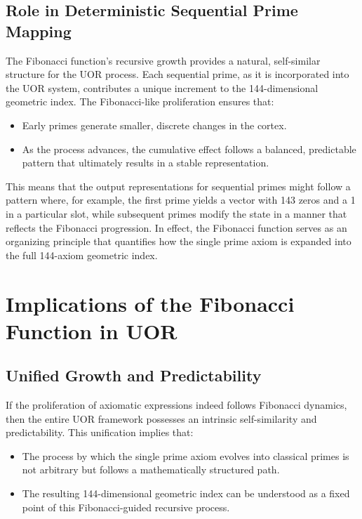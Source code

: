 \documentclass[11pt]{article}
\begin{document}
\subsection{Role in Deterministic Sequential Prime Mapping}
The Fibonacci function’s recursive growth provides a natural, self-similar structure for the UOR process. Each sequential prime, as it is incorporated into the UOR system, contributes a unique increment to the 144-dimensional geometric index. The Fibonacci-like proliferation ensures that:
\begin{itemize}
    \item Early primes generate smaller, discrete changes in the cortex.
    \item As the process advances, the cumulative effect follows a balanced, predictable pattern that ultimately results in a stable representation.
\end{itemize}
This means that the output representations for sequential primes might follow a pattern where, for example, the first prime yields a vector with 143 zeros and a 1 in a particular slot, while subsequent primes modify the state in a manner that reflects the Fibonacci progression. In effect, the Fibonacci function serves as an organizing principle that quantifies how the single prime axiom is expanded into the full 144-axiom geometric index.

\section{Implications of the Fibonacci Function in UOR}
\subsection{Unified Growth and Predictability}
If the proliferation of axiomatic expressions indeed follows Fibonacci dynamics, then the entire UOR framework possesses an intrinsic self-similarity and predictability. This unification implies that:
\begin{itemize}
    \item The process by which the single prime axiom evolves into classical primes is not arbitrary but follows a mathematically structured path.
    \item The resulting 144-dimensional geometric index can be understood as a fixed point of this Fibonacci-guided recursive process.
\end{itemize}
\end{document}
